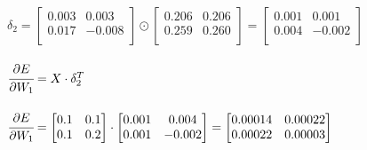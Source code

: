 \documentclass{article}
\begin{document}
\\$\delta_2 = 
\begin{bmatrix}
0.003 & 0.003 \\
0.017 & -0.008 \\
\end{bmatrix} \odot
\begin{bmatrix}
0.206 & 0.206 \\
0.259 & 0.260 \\
\end{bmatrix} = 
\begin{bmatrix}
0.001 & 0.001 \\
0.004 & -0.002 \\
\end{bmatrix}$\\
\\$\cfrac{\partial E}{\partial W_1} = 
X \cdot \delta_2^T$\\
\\$\cfrac{\partial E}{\partial W_1} = 
\begin{bmatrix}
0.1 &  0.1 \\
0.1 &  0.2 \\
\end{bmatrix} \cdot 
\begin{bmatrix}
0.001 & 0.004 \\
0.001 & -0.002 \\
\end{bmatrix} = 
\begin{bmatrix}
0.00014 & 0.00022 \\
0.00022 & 0.00003 \\
\end{bmatrix}$\\

\clearpage
\end{document}
